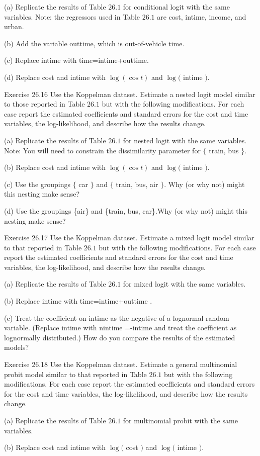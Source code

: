 \documentclass[10pt]{article}
\begin{document}
(a) Replicate the results of Table $26.1$ for conditional logit with the same variables. Note: the regressors used in Table $26.1$ are cost, intime, income, and urban.

(b) Add the variable outtime, which is out-of-vehicle time.

(c) Replace intime with time=intime+outtime.

(d) Replace cost and intime with $\log (\cos t)$ and $\log ($ intime $)$.

Exercise 26.16 Use the Koppelman dataset. Estimate a nested logit model similar to those reported in Table $26.1$ but with the following modifications. For each case report the estimated coefficients and standard errors for the cost and time variables, the log-likelihood, and describe how the results change.

(a) Replicate the results of Table $26.1$ for nested logit with the same variables. Note: You will need to constrain the dissimilarity parameter for $\{$ train, bus $\}$.

(b) Replace cost and intime with $\log (\cos t)$ and $\log ($ intime $)$.

(c) Use the groupings $\{$ car $\}$ and $\{$ train, bus, air $\}$. Why (or why not) might this nesting make sense?

(d) Use the groupings \{air\} and \{train, bus, car\}.Why (or why not) might this nesting make sense?

Exercise 26.17 Use the Koppelman dataset. Estimate a mixed logit model similar to that reported in Table $26.1$ but with the following modifications. For each case report the estimated coefficients and standard errors for the cost and time variables, the log-likelihood, and describe how the results change.

(a) Replicate the results of Table $26.1$ for mixed logit with the same variables.

(b) Replace intime with time=intime+outtime .

(c) Treat the coefficient on intime as the negative of a lognormal random variable. (Replace intime with nintime =-intime and treat the coefficient as lognormally distributed.) How do you compare the results of the estimated models?

Exercise 26.18 Use the Koppelman dataset. Estimate a general multinomial probit model similar to that reported in Table $26.1$ but with the following modifications. For each case report the estimated coefficients and standard errors for the cost and time variables, the log-likelihood, and describe how the results change.

(a) Replicate the results of Table $26.1$ for multinomial probit with the same variables.

(b) Replace cost and intime with $\log ($ cost $)$ and $\log ($ intime $)$.
\end{document}
